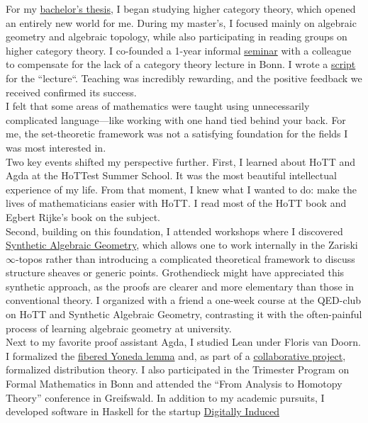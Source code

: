 \documentclass[12pt,headings=small,paper=A4,DIV=calc]{article}
\begin{document}
For my \href{https://uni-bonn.sciebo.de/s/PJUqHE52SnCKJMy}{bachelor's thesis}, I began studying higher category theory, which opened an entirely new world for me. During my master's, I focused mainly on algebraic geometry and algebraic topology, while also participating in reading groups on higher category theory. I co-founded a 1-year informal \href{https://uni-bonn.sciebo.de/s/eEHziabNePFwvb4}{seminar} with a colleague to compensate for the lack of a category theory lecture in Bonn. I wrote a \href{https://uni-bonn.sciebo.de/s/RzjF14df9WvD3O5}{script} for the ``lecture``. Teaching was incredibly rewarding, and the positive feedback we received confirmed its success. \\
I felt that some areas of mathematics were taught using unnecessarily complicated language---like working with one hand tied behind your back. For me, the set-theoretic framework was not a satisfying foundation for the fields I was most interested in. \\
Two key events shifted my perspective further. First, I learned about HoTT and Agda at the HoTTest Summer School. It was the most beautiful intellectual experience of my life. From that moment, I knew what I wanted to do: make the lives of mathematicians easier with HoTT. I read most of the HoTT book and Egbert Rijke's book on the subject. \\
Second, building on this foundation, I attended workshops where I discovered \href{https://github.com/felixwellen/synthetic-zariski}{Synthetic Algebraic Geometry}, which allows one to work internally in the Zariski $\infty$-topos rather than introducing a complicated theoretical framework to discuss structure sheaves or generic points. Grothendieck might have appreciated this synthetic approach, as the proofs are clearer and more elementary than those in conventional theory. I organized with a friend a one-week course at the QED-club on HoTT and Synthetic Algebraic Geometry, contrasting it with the often-painful process of learning algebraic geometry at university. \\

Next to my favorite proof assistant Agda, I studied Lean under Floris van Doorn. I formalized the \href{https://github.com/timlichtnau/LeanCourse23/tree/master/LeanCourse/Project}{fibered Yoneda lemma} and, as part of a \href{https://github.com/timlichtnau/BonnAnalysis/tree/master/BonnAnalysis}{collaborative project}, formalized distribution theory. I also participated in the Trimester Program on Formal Mathematics in Bonn and attended the ``From Analysis to Homotopy Theory'' conference in Greifswald. In addition to my academic pursuits, I developed software in Haskell for the startup \href{https://www.digitallyinduced.com/}{Digitally Induced} \\
\end{document}
